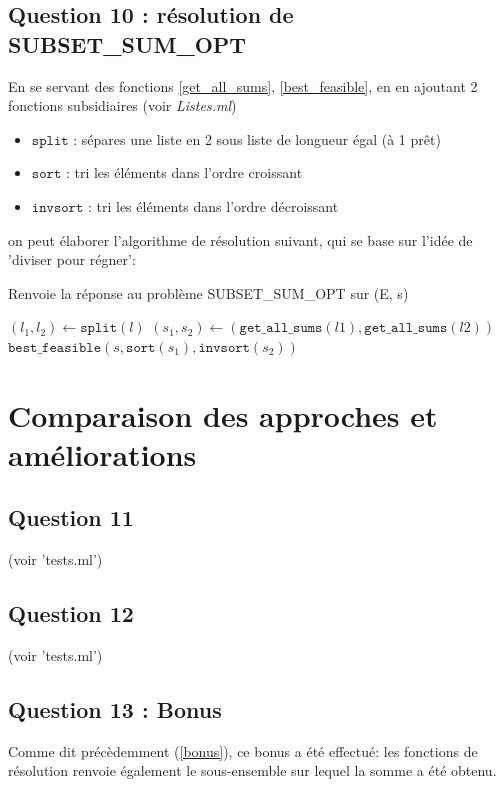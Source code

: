 \documentclass[10pt]{article}
\let\oldReturn\Return
\renewcommand{\Return}{\State\oldReturn}
\begin{document}
			\subsection{Question 10 : résolution de SUBSET\_SUM\_OPT}
				En se servant des fonctions \ref{get_all_sums}, \ref{best_feasible},
				en en ajoutant 2 fonctions subsidiaires (voir \textit{Listes.ml})
				\begin{itemize}[label=-]
					\setlength\itemsep{0.1em}
					\item $\mathtt{split}$ : sépares une liste en 2 sous liste de longueur égal (à 1 prêt)
					\item $\mathtt{sort}$ : tri les éléments dans l'ordre croissant
					\item $\mathtt{invsort}$ : tri les éléments dans l'ordre décroissant
				\end{itemize}
				on peut élaborer l'algorithme de résolution suivant, qui se base sur l'idée de 'diviser pour régner':
				\begin{algorithm}
					\caption{Renvoie la réponse au problème SUBSET\_SUM\_OPT sur (E, s)}
					\begin{algorithmic}[1]
							\State $(l_1, l_2) \leftarrow \mathtt{split}(l)$
							\State $(s_1, s_2) \leftarrow (\mathtt{get\_all\_sums}(l1), \mathtt{get\_all\_sums}(l2))$
							\Return $\mathtt{best\_feasible}(s, \mathtt{sort}(s_1), \mathtt{invsort}(s_2))$
						\EndFunction
					\end{algorithmic}
				\end{algorithm}
				
		\section{Comparaison des approches et améliorations}
			\subsection{Question 11}
				(voir 'tests.ml')
			\subsection{Question 12}
				(voir 'tests.ml')
			\subsection{Question 13 : Bonus}
				Comme dit précèdemment (\ref{bonus}), ce bonus a été effectué: les fonctions de résolution renvoie également
				le sous-ensemble sur lequel la somme a été obtenu.
\end{document}
